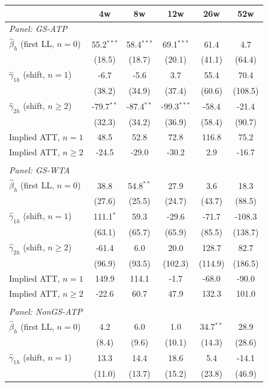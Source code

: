 \begin{tabular}{l*{5}{c}}
\toprule
 & 4w & 8w & 12w & 26w & 52w \\
\midrule
\multicolumn{6}{l}{\textit{Panel: GS-ATP}} \\ \midrule
$\hat{\beta}_h$ (first LL, $n=0$) & 55.2$^{***}$ & 58.4$^{***}$ & 69.1$^{***}$ & 61.4 & 4.7 \\
 & (18.5) & (18.7) & (20.1) & (41.1) & (64.4) \\
$\hat{\gamma}_{1h}$ (shift, $n=1$) & -6.7 & -5.6 & 3.7 & 55.4 & 70.4 \\
 & (38.2) & (34.9) & (37.4) & (60.6) & (108.5) \\
$\hat{\gamma}_{2h}$ (shift, $n\geq 2$) & -79.7$^{**}$ & -87.4$^{**}$ & -99.3$^{***}$ & -58.4 & -21.4 \\
 & (32.3) & (34.2) & (36.9) & (58.4) & (90.7) \\
Implied ATT, $n=1$ & 48.5 & 52.8 & 72.8 & 116.8 & 75.2 \\
Implied ATT, $n\geq 2$ & -24.5 & -29.0 & -30.2 & 2.9 & -16.7 \\
\\[0.3em]
\multicolumn{6}{l}{\textit{Panel: GS-WTA}} \\ \midrule
$\hat{\beta}_h$ (first LL, $n=0$) & 38.8 & 54.8$^{**}$ & 27.9 & 3.6 & 18.3 \\
 & (27.6) & (25.5) & (24.7) & (43.7) & (88.5) \\
$\hat{\gamma}_{1h}$ (shift, $n=1$) & 111.1$^{*}$ & 59.3 & -29.6 & -71.7 & -108.3 \\
 & (63.1) & (65.7) & (65.9) & (85.5) & (138.7) \\
$\hat{\gamma}_{2h}$ (shift, $n\geq 2$) & -61.4 & 6.0 & 20.0 & 128.7 & 82.7 \\
 & (96.9) & (93.5) & (102.3) & (114.9) & (186.5) \\
Implied ATT, $n=1$ & 149.9 & 114.1 & -1.7 & -68.0 & -90.0 \\
Implied ATT, $n\geq 2$ & -22.6 & 60.7 & 47.9 & 132.3 & 101.0 \\
\\[0.3em]
\multicolumn{6}{l}{\textit{Panel: NonGS-ATP}} \\ \midrule
$\hat{\beta}_h$ (first LL, $n=0$) & 4.2 & 6.0 & 1.0 & 34.7$^{**}$ & 28.9 \\
 & (8.4) & (9.6) & (10.1) & (14.3) & (28.6) \\
$\hat{\gamma}_{1h}$ (shift, $n=1$) & 13.3 & 14.4 & 18.6 & 5.4 & -14.1 \\
 & (11.0) & (13.7) & (15.2) & (23.8) & (46.9) \\

\end{tabular}
